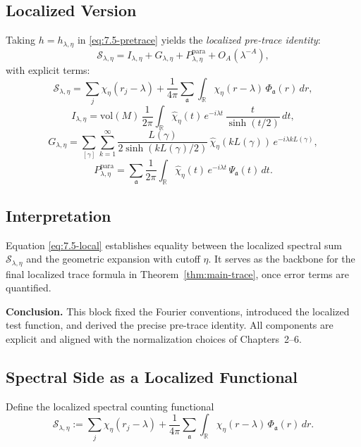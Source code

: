 \subsection{Localized Version}

Taking $h=h_{\lambda,\eta}$ in \eqref{eq:7.5-pretrace} yields the \emph{localized pre-trace identity}:
\begin{equation}\label{eq:7.5-local}
  \mathcal{S}_{\lambda,\eta}
  = I_{\lambda,\eta} + G_{\lambda,\eta} + P_{\lambda,\eta}^{\mathrm{para}} + O_A(\lambda^{-A}),
\end{equation}
with explicit terms:
\[
  \mathcal{S}_{\lambda,\eta} = \sum_j \chi_\eta(r_j-\lambda)
  + \frac{1}{4\pi}\sum_{\mathfrak{a}}\int_{\mathbb{R}}
    \chi_\eta(r-\lambda)\, \Phi_\mathfrak{a}(r)\, dr,
\]
\[
  I_{\lambda,\eta} = \mathrm{vol}(M)\,\frac{1}{2\pi}\int_{\mathbb{R}}
    \widehat{\chi}_\eta(t)\, e^{-i\lambda t}\,\frac{t}{\sinh(t/2)}\, dt,
\]
\[
  G_{\lambda,\eta} = \sum_{[\gamma]}\sum_{k=1}^\infty
    \frac{L(\gamma)}{2\sinh(kL(\gamma)/2)}\, \widehat{\chi}_\eta(kL(\gamma))\, e^{-i\lambda kL(\gamma)},
\]
\[
  P_{\lambda,\eta}^{\mathrm{para}} = \sum_{\mathfrak{a}} \frac{1}{2\pi}\int_{\mathbb{R}}
    \widehat{\chi}_\eta(t)\, e^{-i\lambda t}\,\Psi_\mathfrak{a}(t)\, dt.
\]

\subsection{Interpretation}

Equation \eqref{eq:7.5-local} establishes equality between the localized spectral sum $\mathcal{S}_{\lambda,\eta}$ and the geometric expansion with cutoff $\eta$.  
It serves as the backbone for the final localized trace formula in Theorem~\ref{thm:main-trace}, once error terms are quantified.

\medskip
\noindent\textbf{Conclusion.}  
This block fixed the Fourier conventions, introduced the localized test function, and derived the precise pre-trace identity.  
All components are explicit and aligned with the normalization choices of Chapters~2–6.


\subsection{Spectral Side as a Localized Functional}

Define the localized spectral counting functional
\begin{equation}\label{eq:7.6-spectral}
  \mathcal{S}_{\lambda,\eta}
  := \sum_{j} \chi_\eta(r_j-\lambda)
   + \frac{1}{4\pi}\sum_{\mathfrak{a}}
      \int_{\mathbb{R}} \chi_\eta(r-\lambda)\, \Phi_{\mathfrak{a}}(r)\, dr.
\end{equation}

